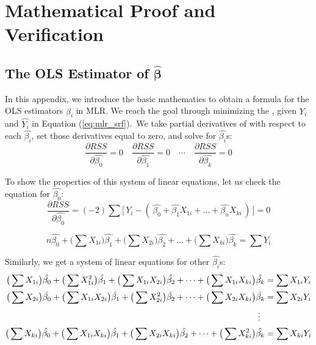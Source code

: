 \section{Mathematical Proof and Verification}\label{appendix:math}
\subsection{The OLS Estimator of $\pmb{\hat{\beta}}$}
\label{appendix:ols}

In this appendix, we introduce the basic mathematics to obtain a formula for the \acs{OLS} estimators $\hat{\beta_{i}}$ in \acs{MLR}. We reach the goal through minimizing the \hyperref[appendix:notations]{}, given $Y_i$ and $\hat{Y_i}$ in Equation (\ref{eq:mlr_srf}). \ie\,We take partial derivatives of \hyperref[appendix:notations]{} with respect to each $\hat{\beta_{i}}$, set those derivatives equal to zero, and solve for $\hat{\beta_{i}}$s:
\[
\frac{\partial RSS}{\partial \hat{\beta_{0}}} = 0 \quad
\frac{\partial RSS}{\partial \hat{\beta_{1}}} = 0 \quad
\dotsm \quad
\frac{\partial RSS}{\partial \hat{\beta_{k}}} = 0
\]

To show the properties of this system of linear equations, let us check the equation for $\hat{\beta_{0}}$:
\[
\frac{\partial RSS}{\partial \hat{\beta_{0}}}=(-2)\sum \big[\,Y_{i}-(\,\hat{\beta_{0}}+\hat{\beta_{1}}X_{1i}+\dots+\hat{\beta_{n}}X_{ki}\,)\,\big]=0
\]

\ie 
$$n\hat{\beta_{0}}+\big(\sum X_{1i}\big)\hat{\beta_{1}}+\big(\sum X_{2i}\big)\hat{\beta_{2}}+\dots+\big(\sum X_{ki}\big)\hat{\beta_{k}}=\sum Y_{i}$$

Similarly, we get a system of linear equations for other $\hat{\beta_{i}}$s:
\begin{equation}\label{eq:ols_sol}
\begin{aligned}
\big(\sum X_{1i}\big)\hat{\beta_{0}}+\big(\sum X_{1i}^2\big)\hat{\beta_{1}}+\big(\sum X_{1i}X_{2i}\big)\hat{\beta_{2}}+\dots+\big(\sum X_{1i}X_{ki}\big)\hat{\beta_{k}}&=\sum X_{1i}Y_{i}
\\
\big(\sum X_{2i}\big)\hat{\beta_{0}}+\big(\sum X_{1i}X_{2i}\big)\hat{\beta_{1}}+\big(\sum X_{2i}^2\big)\hat{\beta_{2}}+\dots+\big(\sum X_{2i}X_{ki}\big)\hat{\beta_{k}}&=\sum X_{2i}Y_{i}
\\
\vdotswithin{=}
\\
\big(\sum X_{ki}\big)\hat{\beta_{0}}+\big(\sum X_{1i}X_{ki}\big)\hat{\beta_{1}}+\big(\sum X_{2i}X_{ki}\big)\hat{\beta_{2}}+\dots+\big(\sum X_{ki}^2\big)\hat{\beta_{k}}&=\sum X_{ki}Y_{i}
\end{aligned} 
\end{equation}


